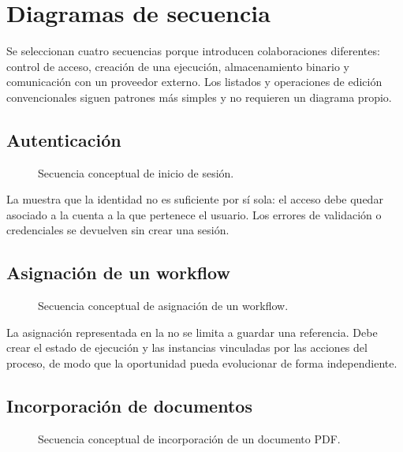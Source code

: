 \section{Diagramas de secuencia}

Se seleccionan cuatro secuencias porque introducen colaboraciones diferentes:
control de acceso, creación de una ejecución, almacenamiento binario y
comunicación con un proveedor externo. Los listados y operaciones de edición
convencionales siguen patrones más simples y no requieren un diagrama propio.

\subsection{Autenticación}

\begin{figure}[H]
  \centering
  \resizebox{\textwidth}{!}{
    
  }
  \caption{Secuencia conceptual de inicio de sesión.}
  \label{fig:sequence-authentication}
\end{figure}

La  muestra que la identidad no es suficiente
por sí sola: el acceso debe quedar asociado a la cuenta a la que pertenece el
usuario. Los errores de validación o credenciales se devuelven sin crear una
sesión.

\subsection{Asignación de un workflow}

\begin{figure}[H]
  \centering
  \resizebox{\textwidth}{!}{
    
  }
  \caption{Secuencia conceptual de asignación de un workflow.}
  \label{fig:sequence-workflow-assignment}
\end{figure}

La asignación representada en la  no se
limita a guardar una referencia. Debe crear el estado de ejecución y las
instancias vinculadas por las acciones del proceso, de modo que la oportunidad
pueda evolucionar de forma independiente.

\subsection{Incorporación de documentos}

\begin{figure}[H]
  \centering
  \resizebox{\textwidth}{!}{
    
  }
  \caption{Secuencia conceptual de incorporación de un documento PDF.}
  \label{fig:sequence-document-upload}
\end{figure}

